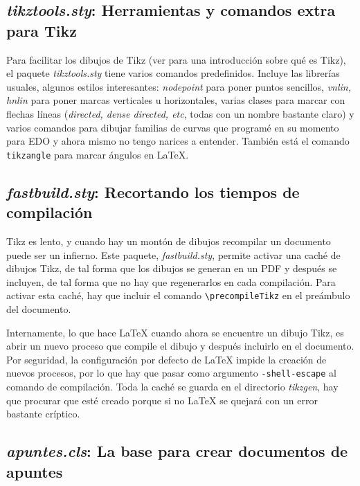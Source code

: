 \subsection{\textit{tikztools.sty}: Herramientas y comandos extra para Tikz}
\label{sec:Tikztools}

Para facilitar los dibujos de Tikz (ver  para una introducción sobre qué es Tikz), el paquete \textit{tikztools.sty} tiene varios comandos predefinidos. Incluye las librerías usuales, algunos estilos interesantes: \textit{nodepoint} para poner puntos sencillos, \textit{vnlin, hnlin} para poner marcas verticales u horizontales, varias clases para marcar con flechas líneas (\textit{directed, dense directed, etc}, todas con un nombre bastante claro) y varios comandos para dibujar familias de curvas que programé en su momento para EDO y ahora mismo no tengo narices a entender. También está el comando \texttt{tikzangle} para marcar ángulos en LaTeX.

\subsection{\textit{fastbuild.sty}: Recortando los tiempos de compilación}
\label{sec:fastbuild}

Tikz es lento, y cuando hay un montón de dibujos recompilar un documento puede ser un infierno. Este paquete, \textit{fastbuild.sty}, permite activar una caché de dibujos Tikz, de tal forma que los dibujos se generan en un PDF y después se incluyen, de tal forma que no hay que regenerarlos en cada compilación. Para activar esta caché, hay que incluir el comando \verb|\precompileTikz| en el preámbulo del documento.

Internamente, lo que hace LaTeX cuando ahora se encuentre un dibujo Tikz, es abrir un nuevo proceso que compile el dibujo y después incluirlo en el documento. Por seguridad, la configuración por defecto de LaTeX impide la creación de nuevos procesos, por lo que hay que pasar como argumento \texttt{-shell-escape} al comando de compilación. Toda la caché se guarda en el directorio \textit{tikzgen}, hay que procurar que esté creado porque si no LaTeX se quejará con un error bastante críptico.

\subsection{\textit{apuntes.cls}: La base para crear documentos de apuntes}
\label{sec:ApuntesCls}


